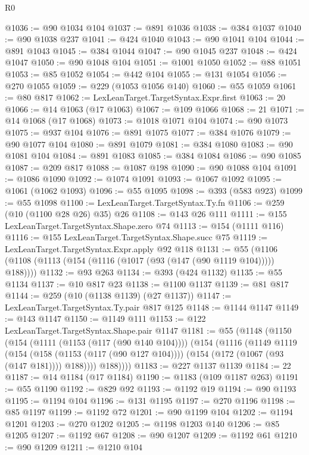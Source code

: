 \begin{lexlean}{R0}
\begin{coremodule}
@1036 := @90 @1034 @104
@1037 := @891 @1036
@1038 := @384 @1037
@1040 := @90 @1038 @237
@1041 := @424 @1040
@1043 := @90 @1041 @104
@1044 := @891 @1043
@1045 := @384 @1044
@1047 := @90 @1045 @237
@1048 := @424 @1047
@1050 := @90 @1048 @104
@1051 := @1001 @1050
@1052 := @88 @1051
@1053 := @85 @1052
@1054 := @442 @104
@1055 := @131 @1054
@1056 := @270 @1055
@1059 := @229 (@1053 @1056 @140)
@1060 := @55 @1059
@1061 := @80 @817
@1062 := LexLeanTarget.TargetSyntax.Expr.first
@1063 := 20
@1066 := @14 @1063 (@17 @1063)
@1067 := @109 @1066
@1068 := 21
@1071 := @14 @1068 (@17 @1068)
@1073 := @1018 @1071 @104
@1074 := @90 @1073
@1075 := @937 @104
@1076 := @891 @1075
@1077 := @384 @1076
@1079 := @90 @1077 @104
@1080 := @891 @1079
@1081 := @384 @1080
@1083 := @90 @1081 @104
@1084 := @891 @1083
@1085 := @384 @1084
@1086 := @90 @1085
@1087 := @209 @817
@1088 := @1087 @198
@1090 := @90 @1088 @104
@1091 := @1086 @1090
@1092 := @1074 @1091
@1093 := @1067 @1092
@1095 := @1061 (@1062 @1093)
@1096 := @55 @1095
@1098 := @393 (@583 @923)
@1099 := @55 @1098
@1100 := LexLeanTarget.TargetSyntax.Ty.fn
@1106 := @259 (@10 (@1100 @28 @26) @35) @26
@1108 := @143 @26 @111
@1111 := @155 LexLeanTarget.TargetSyntax.Shape.zero @74
@1113 := @154 (@1111 @116)
@1116 := @155 LexLeanTarget.TargetSyntax.Shape.succ @75
@1119 := LexLeanTarget.TargetSyntax.Expr.apply @92 @118
@1131 := @55 (@1106 (@1108 (@1113 (@154 (@1116 (@1017 (@93 (@147 (@90 @1119 @104))))) @188))))
@1132 := @93 @263
@1134 := @393 (@424 @1132)
@1135 := @55 @1134
@1137 := @10 @817 @23
@1138 := @1100 @1137
@1139 := @81 @817
@1144 := @259 (@10 (@1138 @1139) (@27 @1137))
@1147 := LexLeanTarget.TargetSyntax.Ty.pair @817 @125
@1148 := @1144 @1147
@1149 := @143 @1147
@1150 := @1149 @111
@1153 := @122 LexLeanTarget.TargetSyntax.Shape.pair @1147
@1181 := @55
    (@1148
      (@1150
        (@154
          (@1111 (@1153 (@117 (@90 @140 @104))))
          (@154
            (@1116
              (@1149
                @1119
                (@154
                  (@158 (@1153 (@117 (@90 @127 @104))))
                  (@154 (@172 (@1067 (@93 (@147 @181)))) @188))))
            @188))))
@1183 := @227 @1137 @1139
@1184 := 22
@1187 := @14 @1184 (@17 @1184)
@1190 := @1183 (@109 @1187 @263)
@1191 := @55 @1190
@1192 := @829 @92
@1193 := @1192 @19
@1194 := @90 @1193
@1195 := @1194 @104
@1196 := @131 @1195
@1197 := @270 @1196
@1198 := @85 @1197
@1199 := @1192 @72
@1201 := @90 @1199 @104
@1202 := @1194 @1201
@1203 := @270 @1202
@1205 := @1198 @1203 @140
@1206 := @85 @1205
@1207 := @1192 @67
@1208 := @90 @1207
@1209 := @1192 @61
@1210 := @90 @1209
@1211 := @1210 @104

\end{coremodule}
\end{lexlean}
